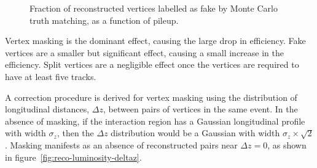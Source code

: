 \begin{figure}[h]
{		\label{fig:fake-mu-murecmc}
	}
	\caption{Fraction of reconstructed vertices labelled as fake by Monte Carlo truth matching, as a function of pileup.}
	\label{fig:fake-fractions}
\end{figure}


Vertex masking is the dominant effect, causing the large drop in efficiency. Fake vertices are a smaller but significant effect, causing a small increase in the efficiency. Split vertices are a negligible effect once the vertices are required to have at least five tracks. 

A correction procedure is derived for vertex masking using the distribution of longitudinal distances, $\Delta z$, between pairs of vertices in the same event. In the absence of masking, if the interaction region has a Gaussian longitudinal profile with width $\sigma_z$, then the $\Delta z$ distribution would be a Gaussian with width $\sigma_z\times\sqrt{2}$. Masking manifests as an absence of reconstructed pairs near $\Delta z=0$, as shown in figure~\ref{fig:reco-luminosity-deltaz}. 

